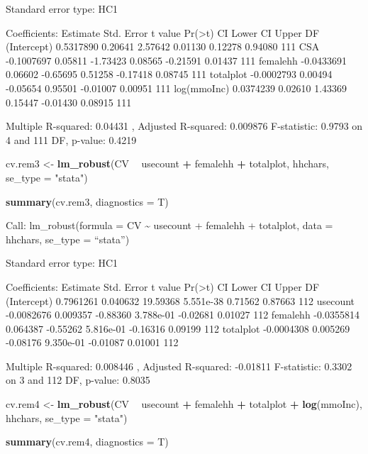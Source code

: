 \documentclass[
]{article}
\newenvironment{Shaded}{\begin{snugshade}}{\end{snugshade}}
\newcommand{\DataTypeTok}[1]{\textcolor[rgb]{0.13,0.29,0.53}{#1}}
\newcommand{\KeywordTok}[1]{\textcolor[rgb]{0.13,0.29,0.53}{\textbf{#1}}}
\newcommand{\NormalTok}[1]{#1}
\newcommand{\OperatorTok}[1]{\textcolor[rgb]{0.81,0.36,0.00}{\textbf{#1}}}
\newcommand{\StringTok}[1]{\textcolor[rgb]{0.31,0.60,0.02}{#1}}
\begin{document}
Standard error type: HC1

Coefficients: Estimate Std. Error t value
Pr(\textgreater\textbar t\textbar) CI Lower CI Upper DF (Intercept)
0.5317890 0.20641 2.57642 0.01130 0.12278 0.94080 111 CSA -0.1007697
0.05811 -1.73423 0.08565 -0.21591 0.01437 111 femalehh -0.0433691
0.06602 -0.65695 0.51258 -0.17418 0.08745 111 totalplot -0.0002793
0.00494 -0.05654 0.95501 -0.01007 0.00951 111 log(mmoInc) 0.0374239
0.02610 1.43369 0.15447 -0.01430 0.08915 111

Multiple R-squared: 0.04431 , Adjusted R-squared: 0.009876 F-statistic:
0.9793 on 4 and 111 DF, p-value: 0.4219

\begin{Shaded}
\begin{Highlighting}[]
\NormalTok{cv.rem3 <-}\StringTok{ }\KeywordTok{lm_robust}\NormalTok{(CV }\OperatorTok{~}\StringTok{ }\NormalTok{usecount }\OperatorTok{+}\StringTok{ }\NormalTok{femalehh  }\OperatorTok{+}\StringTok{ }\NormalTok{totalplot, hhchars,}
                     \DataTypeTok{se_type =} \StringTok{"stata"}\NormalTok{)}

\KeywordTok{summary}\NormalTok{(cv.rem3, }\DataTypeTok{diagnostics =}\NormalTok{ T)}
\end{Highlighting}
\end{Shaded}

Call: lm\_robust(formula = CV \textasciitilde{} usecount + femalehh +
totalplot, data = hhchars, se\_type = ``stata'')

Standard error type: HC1

Coefficients: Estimate Std. Error t value
Pr(\textgreater\textbar t\textbar) CI Lower CI Upper DF (Intercept)
0.7961261 0.040632 19.59368 5.551e-38 0.71562 0.87663 112 usecount
-0.0082676 0.009357 -0.88360 3.788e-01 -0.02681 0.01027 112 femalehh
-0.0355814 0.064387 -0.55262 5.816e-01 -0.16316 0.09199 112 totalplot
-0.0004308 0.005269 -0.08176 9.350e-01 -0.01087 0.01001 112

Multiple R-squared: 0.008446 , Adjusted R-squared: -0.01811 F-statistic:
0.3302 on 3 and 112 DF, p-value: 0.8035

\begin{Shaded}
\begin{Highlighting}[]
\NormalTok{cv.rem4 <-}
\StringTok{  }\KeywordTok{lm_robust}\NormalTok{(CV }\OperatorTok{~}\StringTok{ }\NormalTok{usecount }\OperatorTok{+}\StringTok{ }\NormalTok{femalehh  }\OperatorTok{+}\StringTok{ }\NormalTok{totalplot }\OperatorTok{+}\StringTok{ }\KeywordTok{log}\NormalTok{(mmoInc),}
\NormalTok{            hhchars,}
            \DataTypeTok{se_type =} \StringTok{"stata"}\NormalTok{)}

\KeywordTok{summary}\NormalTok{(cv.rem4, }\DataTypeTok{diagnostics =}\NormalTok{ T)}
\end{Highlighting}
\end{Shaded}
\end{document}
